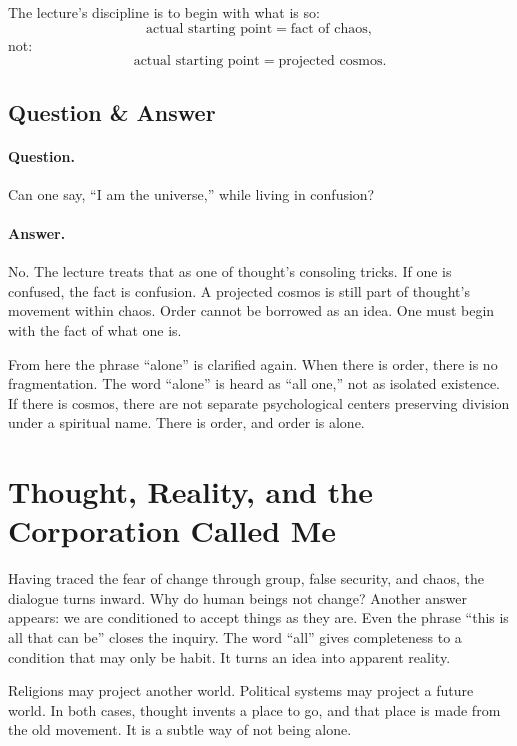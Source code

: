 The lecture's discipline is to begin with what is so:
\begin{equation}
\text{actual starting point} = \text{fact of chaos},
\end{equation}
not:
\begin{equation}
\text{actual starting point} = \text{projected cosmos}.
\end{equation}

\subsection{Question \& Answer}

\paragraph{Question.}
Can one say, ``I am the universe,'' while living in confusion?

\paragraph{Answer.}
No. The lecture treats that as one of thought's consoling tricks. If one is confused, the fact is confusion. A projected cosmos is still part of thought's movement within chaos. Order cannot be borrowed as an idea. One must begin with the fact of what one is.

From here the phrase ``alone'' is clarified again. When there is order, there is no fragmentation. The word ``alone'' is heard as ``all one,'' not as isolated existence. If there is cosmos, there are not separate psychological centers preserving division under a spiritual name. There is order, and order is alone.

\section{Thought, Reality, and the Corporation Called Me}

Having traced the fear of change through group, false security, and chaos, the dialogue turns inward. Why do human beings not change? Another answer appears: we are conditioned to accept things as they are. Even the phrase ``this is all that can be'' closes the inquiry. The word ``all'' gives completeness to a condition that may only be habit. It turns an idea into apparent reality.

Religions may project another world. Political systems may project a future world. In both cases, thought invents a place to go, and that place is made from the old movement. It is a subtle way of not being alone.

